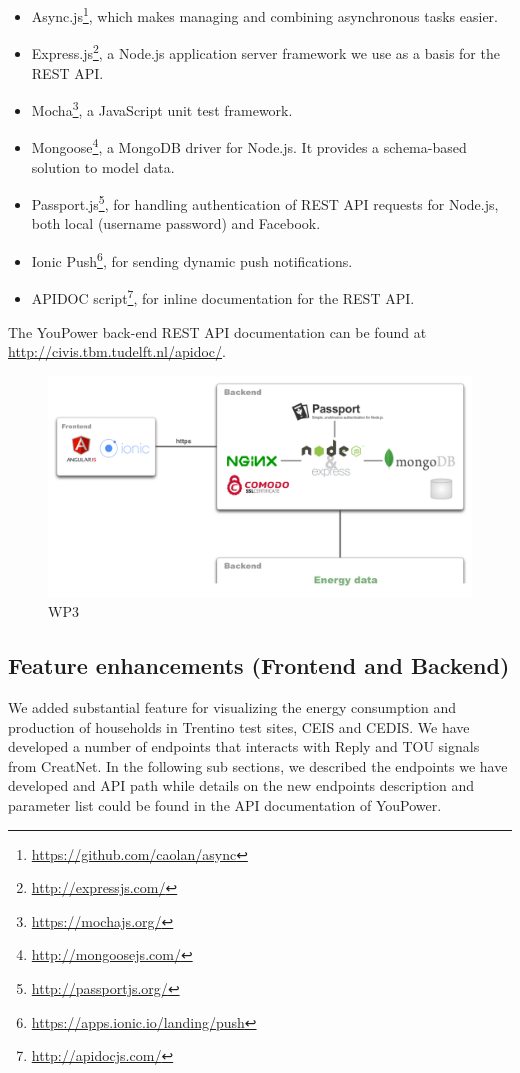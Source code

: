 \begin{itemize}
\item Async.js\footnote{\url{https://github.com/caolan/async}}, which makes managing and combining asynchronous tasks easier. 
\item Express.js\footnote{\url{http://expressjs.com/}}, a Node.js application server framework we use as a basis for the REST API. 
\item Mocha\footnote{\url{https://mochajs.org/}}, a JavaScript unit test framework. 
\item Mongoose\footnote{\url{http://mongoosejs.com/}}, a MongoDB driver for Node.js. It provides a schema-based solution to model data. 
\item Passport.js\footnote{\url{http://passportjs.org/}}, for handling authentication of REST API requests for Node.js, both local (username password) and Facebook. 
\item Ionic Push\footnote{\url{https://apps.ionic.io/landing/push}}, for sending dynamic push notifications. 
\item APIDOC script\footnote{\url{http://apidocjs.com/}}, for inline documentation for the REST API. 
\end{itemize}

The YouPower back-end REST API documentation can be found at {\footnotesize\url{http://civis.tbm.tudelft.nl/apidoc/}}. 
% 


\begin{figure}
\centering
\includegraphics[width=0.9\linewidth]{img/tech}
\caption{WP3}
\label{fig:ScreenShot2015-11-09at18}
\end{figure}

\subsection{Feature enhancements (Frontend and Backend)}
We added substantial feature for visualizing the energy consumption and production of households in Trentino test sites, CEIS and CEDIS. We have developed a number of endpoints that interacts with Reply and  TOU signals from CreatNet. In the following sub sections, we described the endpoints we have developed and API path while details on the new endpoints description and parameter list could be found in the API documentation of YouPower.


